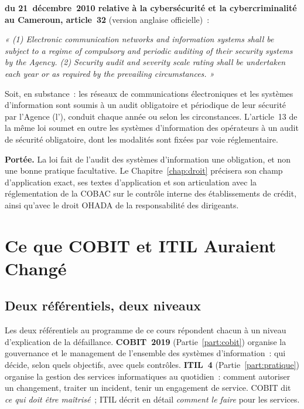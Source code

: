 \begin{boxjuris}
\textbf{ du 21~décembre~2010 relative à la
cybersécurité et la cybercriminalité au Cameroun, article~32} (version
anglaise officielle)~:

\medskip
\textit{« (1) Electronic communication networks and information systems
shall be subject to a regime of compulsory and periodic auditing of their
security systems by the Agency. (2) Security audit and severity scale
rating shall be undertaken each year or as required by the prevailing
circumstances. »}

\medskip
Soit, en substance~: les réseaux de communications électroniques et les
systèmes d'information sont soumis à un audit obligatoire et périodique de
leur sécurité par l'Agence (l'), conduit chaque année ou
selon les circonstances. L'article~13 de la même loi soumet en outre les
systèmes d'information des opérateurs à un audit de sécurité obligatoire,
dont les modalités sont fixées par voie réglementaire.

\medskip
\textbf{Portée.} La loi fait de l'audit des systèmes d'information une
obligation, et non une bonne pratique facultative. Le
Chapitre~\ref{chap:droit} précisera son champ d'application exact, ses
textes d'application et son articulation avec la réglementation de la
COBAC sur le contrôle interne des établissements de crédit, ainsi qu'avec
le droit OHADA de la responsabilité des dirigeants.
\end{boxjuris}

\section{Ce que COBIT et ITIL Auraient Changé}
\label{sec:pro-cobit-itil}

\subsection{Deux référentiels, deux niveaux}

Les deux référentiels au programme de ce cours répondent chacun à un niveau
d'explication de la défaillance. \textbf{COBIT~2019} (Partie~\ref{part:cobit})
organise la gouvernance et le management de l'ensemble des systèmes
d'information~: qui décide, selon quels objectifs, avec quels contrôles.
\textbf{ITIL~4} (Partie~\ref{part:pratique}) organise la gestion des
services informatiques au quotidien~: comment autoriser un changement,
traiter un incident, tenir un engagement de service. COBIT dit \emph{ce qui
doit être maîtrisé}~; ITIL décrit en détail \emph{comment le faire} pour
les services.

